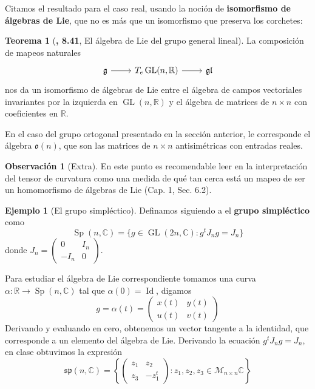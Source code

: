 \documentclass[spanish]{book}
\theoremstyle{definition}
\newtheorem*{teo}{Teorema}
\newtheorem*{obs}{Observación}
\newtheorem*{ejem}{Ejemplo}
\newcommand{\R}{\mathbb{R}}
\newcommand{\C}{\mathbb{C}}
\DeclareMathOperator{\Id}{Id}
\begin{document}
	Citamos el resultado para el caso real, usando la noción de \textbf{isomorfismo de álgebras de Lie}, que no es más que un isomorfismo que preserva los corchetes:
	
	\begin{teo}[\cite{Lee}\textbf{, 8.41}, El álgebra de Lie del grupo general lineal]
		La composición de mapeos naturales
		\[\begin{tikzcd}
			\mathfrak{g}\arrow{r}&T_{e}\operatorname{GL}(n,\R)\arrow{r}&\mathfrak{gl}
		\end{tikzcd}\]
		nos da un isomorfismo de álgebras de Lie entre el álgebra de campos vectoriales invariantes por la izquierda en $\operatorname{GL}(n,\R)$ y el álgebra de matrices de $n\times n$ con coeficientes en $\R$.
	\end{teo}
	
	En el caso del grupo ortogonal presentado en la sección anterior, le corresponde el álgebra $\mathfrak{o}(n)$, que son las matrices de $n\times n$ antisimétricas con entradas reales.
	
	\begin{obs}[Extra]
		En este punto es recomendable leer en \cite{Loring-dif} la interpretación del tensor de curvatura como una medida de qué tan cerca está un mapeo de ser un homomorfismo de álgebras de Lie (Cap. 1, Sec. 6.2).
	\end{obs}

	
	\begin{ejem}[El grupo simpléctico]
	Definamos siguiendo a \cite{Helgason} el \textbf{grupo simpléctico} como
	\[\operatorname{Sp}(n,\C)=\{g\in\operatorname{GL}(2n,\C):g^tJ_ng=J_n\}\]
	donde $J_n=\begin{pmatrix}
		0&I_n\\
		-I_n&0
	\end{pmatrix}$.
	
	Para estudiar el álgebra de Lie correspondiente tomamos una curva $\alpha:\R\to\operatorname{Sp}(n,\C)$ tal que $\alpha(0)=\Id$, digamos
	\[g=\alpha(t)=\begin{pmatrix}
		x(t)&y(t)\\
		u(t)&v(t)
	\end{pmatrix}\]
	Derivando y evaluando en cero, obtenemos un vector tangente a la identidad, que corresponde a un elemento del álgebra de Lie. Derivando la ecuación $g^tJ_ng=J_n$, en clase obtuvimos la expresión 
	\[\mathfrak{sp}(n,\C)=\left\{\begin{pmatrix}
		z_1&z_2\\
		z_3&-z_1^t\end{pmatrix}:z_1,z_2,z_3\in\mathcal{M}_{n\times n}\C
	\right\}\]
	\end{ejem}
\end{document}
